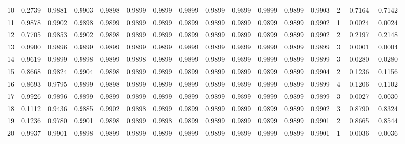\begin{tabular}{lrrrrrrrrrrrrrrr}
10  &      0.2739 &  0.9881 &  0.9903 &  0.9898 &  0.9899 &  0.9899 &  0.9899 &  0.9899 &  0.9899 &  0.9899 &   0.9899 &     0.9903 &      2 &                    0.7164 &                     0.7142 \\
11  &      0.9878 &  0.9902 &  0.9898 &  0.9899 &  0.9899 &  0.9899 &  0.9899 &  0.9899 &  0.9899 &  0.9899 &   0.9899 &     0.9902 &      1 &                    0.0024 &                     0.0024 \\
12  &      0.7705 &  0.9853 &  0.9902 &  0.9898 &  0.9899 &  0.9899 &  0.9899 &  0.9899 &  0.9899 &  0.9899 &   0.9899 &     0.9902 &      2 &                    0.2197 &                     0.2148 \\
13  &      0.9900 &  0.9896 &  0.9899 &  0.9899 &  0.9899 &  0.9899 &  0.9899 &  0.9899 &  0.9899 &  0.9899 &   0.9899 &     0.9899 &      3 &                   -0.0001 &                    -0.0004 \\
14  &      0.9619 &  0.9899 &  0.9898 &  0.9899 &  0.9898 &  0.9899 &  0.9899 &  0.9899 &  0.9899 &  0.9899 &   0.9899 &     0.9899 &      3 &                    0.0280 &                     0.0280 \\
15  &      0.8668 &  0.9824 &  0.9904 &  0.9898 &  0.9899 &  0.9899 &  0.9899 &  0.9899 &  0.9899 &  0.9899 &   0.9899 &     0.9904 &      2 &                    0.1236 &                     0.1156 \\
16  &      0.8693 &  0.9795 &  0.9899 &  0.9898 &  0.9899 &  0.9899 &  0.9899 &  0.9899 &  0.9899 &  0.9899 &   0.9899 &     0.9899 &      4 &                    0.1206 &                     0.1102 \\
17  &      0.9926 &  0.9896 &  0.9899 &  0.9899 &  0.9899 &  0.9899 &  0.9899 &  0.9899 &  0.9899 &  0.9899 &   0.9899 &     0.9899 &      3 &                   -0.0027 &                    -0.0030 \\
18  &      0.1112 &  0.9436 &  0.9885 &  0.9902 &  0.9898 &  0.9899 &  0.9899 &  0.9899 &  0.9899 &  0.9899 &   0.9899 &     0.9902 &      3 &                    0.8790 &                     0.8324 \\
19  &      0.1236 &  0.9780 &  0.9901 &  0.9898 &  0.9899 &  0.9898 &  0.9899 &  0.9899 &  0.9899 &  0.9899 &   0.9899 &     0.9901 &      2 &                    0.8665 &                     0.8544 \\
20  &      0.9937 &  0.9901 &  0.9898 &  0.9899 &  0.9899 &  0.9899 &  0.9899 &  0.9899 &  0.9899 &  0.9899 &   0.9899 &     0.9901 &      1 &                   -0.0036 &                    -0.0036 \\

\end{tabular}
